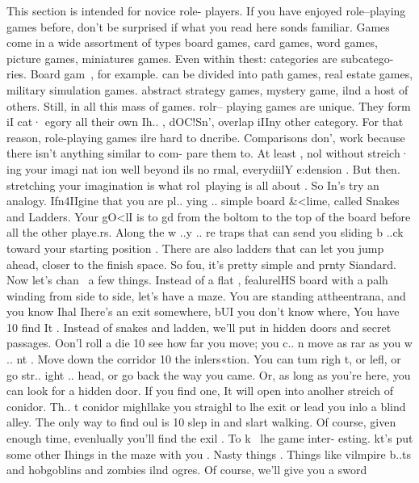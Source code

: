 \documentclass[../main.tex]{subfiles}
\begin{document}
	\begin{multicols}{3}
		This section is intended for novice role-
		players. If you have enjoyed role--playing
		games before, don't be surprised if what you
		read here sonds familiar.
		Games come in a wide assortment of
		types board games, card games, word
		games, picture games, miniatures games.
		Even within thest: categories are subcatego-
		ries. Board gam~, for example. can be
		divided into path games, real estate games,
		military simulation games. abstract strategy
		games, mystery game, ilnd a host of others.
		Still, in all this mass of games. rolr--
		playing games are unique. They form iI cat·
		egory all their own Ih.. , dOC!Sn', overlap iIIny
		other category.
		For that reason, role-playing games ilre
		hard to dncribe. Comparisons don', work
		because there isn't anything similar to com-
		pare them to. At least , nol without streich·
		ing your imagi nat ion well beyond ils
		no rmal, everydiilY e:dension .
		But then. stretching your imagination is
		what rol~playing is all about . So In's try an
		analogy.
		Ifn4IIgine that you are pl.. ying .. simple
		board &<lime, called Snakes and Ladders.
		Your gO<lI is to gd from the boltom to the
		top of the board before all the other playe.rs.
		Along the w ..y .. re traps that can send you
		sliding b ..ck toward your starting position .
		There are also ladders that can let you jump
		ahead, closer to the finish space. So fou, it's
		pretty simple and prnty Siandard.
		Now let's chan~ a few things. Instead of
		a flat , fealurelHS board with a palh winding
		from side to side, let's have a maze. You are
		standing attheentrana, and you know Ihal
		Ihere's an exit somewhere, bUI you don't
		know where, You have 10 find It .
		Instead of snakes and ladden, we'll put in
		hidden doors and secret passages. Oon'l roll
		a die 10 see how far you move; you c.. n
		move as rar as you w .. nt . Move down the
		corridor 10 the inlers«tion. You can tum
		righ t, or lefl, or go str.. ight .. head, or go
		back the way you came. Or, as long as
		you're here, you can look for a hidden door.
		If you find one, It will open into anolher
		streich of conidor. Th.. t conidor mighllake
		you straighl to lhe exit or lead you inlo a
		blind alley. The only way to find oul is 10
		slep in and slart walking.
		Of course, given enough time, evenlually
		you'll find the exil . To k~ lhe game inter-
		esting. kt's put some other Ihings in the
		maze with you . Nasty things . Things like
		vilmpire b..ts and hobgoblins and zombies
		ilnd ogres. Of course, we'll give you a sword

\end{multicols}
\end{document}
